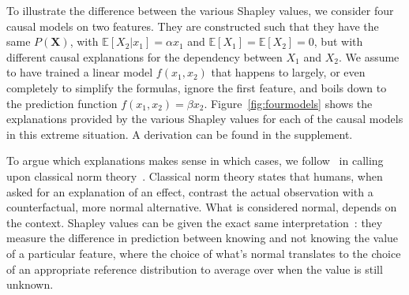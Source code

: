 \documentclass{article}
\newcommand{\vX}{\mathbf{X}}
\newcommand{\expectation}{\mathbb{E}}
\newcommand{\comment}[1]{{\color{red} #1}}
\begin{document}
To illustrate the difference between the various Shapley values, we consider four causal models on two features. They are constructed such that they have the same $P(\vX)$, with $\expectation[X_2|x_1] = \alpha x_1$ and $\expectation[X_1] = \expectation[X_2] = 0$, but with different causal explanations for the dependency between $X_1$ and $X_2$.
We assume to have trained a linear model $f(x_1,x_2)$ that happens to largely, or even completely to simplify the formulas, ignore the first feature, and boils down to the prediction function $f(x_1,x_2) = \beta x_2$. Figure~\ref{fig:fourmodels} shows the explanations provided by the various Shapley values for each of the causal models in this extreme situation. A derivation can be found in the supplement.

To argue which explanations makes sense in which cases, we follow~\cite{merrick2019explanation} in calling upon classical norm theory~\cite{kahneman1986norm}. Classical norm theory states that humans, when asked for an explanation of an effect, contrast the actual observation with a counterfactual, more normal alternative. What is considered normal, depends on the context. Shapley values can be given the exact same interpretation~\cite{merrick2019explanation}: they measure the difference in prediction between knowing and not knowing the value of a particular feature, where the choice of what's normal translates to the choice of an appropriate reference distribution to average over when the value is still unknown.
\end{document}
